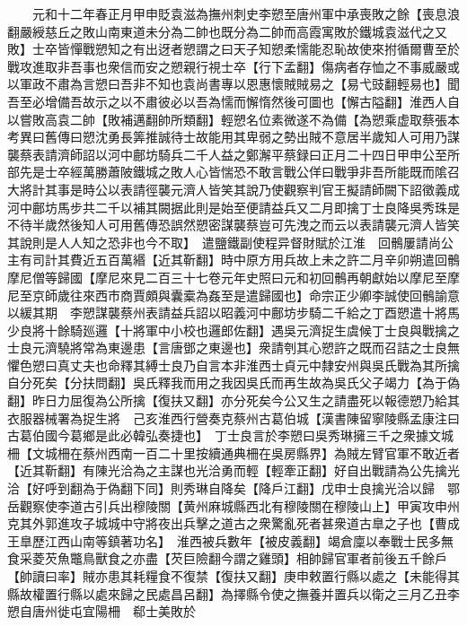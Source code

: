　　元和十二年春正月甲申貶袁滋為撫州刺史李愬至唐州軍中承喪敗之餘【喪息浪翻嚴綬慈丘之敗山南東道未分為二帥也既分為二帥而高霞寓敗於鐵城袁滋代之又敗】士卒皆憚戰愬知之有出迓者愬謂之曰天子知愬柔懦能忍恥故使來拊循爾曹至於戰攻進取非吾事也衆信而安之愬親行視士卒【行下孟翻】傷病者存恤之不事威嚴或以軍政不肅為言愬曰吾非不知也袁尚書專以恩惠懷賊賊易之【易弋豉翻輕易也】聞吾至必增備吾故示之以不肅彼必以吾為懦而懈惰然後可圖也【懈古隘翻】淮西人自以嘗敗高袁二帥【敗補邁翻帥所類翻】輕愬名位素微遂不為備【為愬乘虚取蔡張本　考異曰舊傳曰愬沈勇長筭推誠待士故能用其卑弱之勢出賊不意居半歲知人可用乃謀襲蔡表請濟師詔以河中鄜坊騎兵二千人益之鄭澥平蔡録曰正月二十四日甲申公至所部先是士卒經萬勝蕭陂鐵城之敗人心皆惴恐不敢言戰公佯曰戰爭非吾所能既而隂召大將計其事是時公以表請徑襲元濟人皆笑其說乃使觀察判官王擬請師闕下詔徵義成河中鄜坊馬步共二千以補其闕据此則是始至便請益兵又二月即擒丁士良降吳秀珠是不待半歲然後知人可用舊傳恐誤然愬密謀襲蔡豈可先洩之而云以表請襲元濟人皆笑其說則是人人知之恐非也今不取】　遣鹽鐵副使程异督財賦於江淮　回鶻屢請尚公主有司計其費近五百萬緡【近其靳翻】時中原方用兵故上未之許二月辛卯朔遣回鶻摩尼僧等歸國【摩尼來見二百三十七卷元年史照曰元和初回鶻再朝獻始以摩尼至摩尼至京師歲往來西市商賈頗與囊槖為姦至是遣歸國也】命宗正少卿李誠使回鶻諭意以緩其期　李愬謀襲蔡州表請益兵詔以昭義河中鄜坊步騎二千給之丁酉愬遣十將馬少良將十餘騎廵邏【十將軍中小校也邏郎佐翻】遇吳元濟捉生虞候丁士良與戰擒之士良元濟驍將常為東邊患【言唐鄧之東邊也】衆請刳其心愬許之既而召詰之士良無懼色愬曰真丈夫也命釋其縛士良乃自言本非淮西士貞元中隸安州與吳氏戰為其所擒自分死矣【分扶問翻】吳氏釋我而用之我因吳氏而再生故為吳氏父子竭力【為于偽翻】昨日力屈復為公所擒【復扶又翻】亦分死矣今公又生之請盡死以報德愬乃給其衣服器械署為捉生將　己亥淮西行營奏克蔡州古葛伯城【漢書陳留寧陵縣孟康注曰古葛伯國今葛鄉是此必韓弘奏捷也】　丁士良言於李愬曰吳秀琳擁三千之衆據文城柵【文城柵在蔡州西南一百二十里按續通典柵在吳房縣界】為賊左臂官軍不敢近者【近其靳翻】有陳光洽為之主謀也光洽勇而輕【輕牽正翻】好自出戰請為公先擒光洽【好呼到翻為于偽翻下同】則秀琳自降矣【降戶江翻】戊申士良擒光洽以歸　鄂岳觀察使李道古引兵出穆陵關【黄州麻城縣西北有穆陵關在穆陵山上】甲寅攻申州克其外郭進攻子城城中守將夜出兵擊之道古之衆驚亂死者甚衆道古臯之子也【曹成王臯歷江西山南等鎮著功名】　淮西被兵數年【被皮義翻】竭倉廩以奉戰士民多無食采菱芡魚鼈鳥獸食之亦盡【芡巨險翻今謂之雞頭】相帥歸官軍者前後五千餘戶【帥讀曰率】賊亦患其耗糧食不復禁【復扶又翻】庚申敕置行縣以處之【未能得其縣故權置行縣以處來歸之民處昌呂翻】為擇縣令使之撫養并置兵以衛之三月乙丑李愬自唐州徙屯宜陽柵　郗士美敗於

